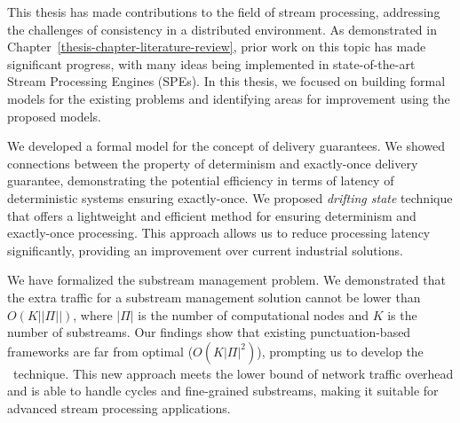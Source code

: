 This thesis has made contributions to the field of stream processing, addressing the challenges of consistency in a distributed environment. As demonstrated in Chapter~\ref{thesis-chapter-literature-review}, prior work on this topic has made significant progress, with many ideas being implemented in state-of-the-art Stream Processing Engines (SPEs). In this thesis, we focused on building formal models for the existing problems and identifying areas for improvement using the proposed models.

We developed a formal model for the concept of delivery guarantees. We showed connections between the property of determinism and exactly-once delivery guarantee, demonstrating the potential efficiency in terms of latency of deterministic systems ensuring exactly-once. We proposed {\em drifting state} technique that offers a lightweight and efficient method for ensuring determinism and exactly-once processing. This approach allows us to reduce processing latency significantly, providing an improvement over current industrial solutions.

We have formalized the substream management problem. We demonstrated that the extra traffic for a substream management solution cannot be lower than $O(K||\Pi||)$, where $|\Pi|$ is the number of computational nodes and $K$ is the number of substreams. Our findings show that existing punctuation-based frameworks are far from optimal ($O(K|\Pi|^2)$), prompting us to develop the \tracker\ technique. This new approach meets the lower bound of network traffic overhead and is able to handle cycles and fine-grained substreams, making it suitable for advanced stream processing applications.

